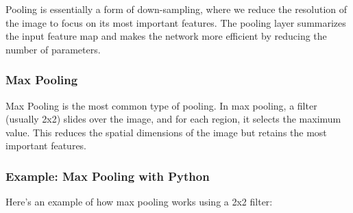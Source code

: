 \documentclass[
  letterpaper,
  DIV=11,
  numbers=noendperiod]{scrreprt}
\begin{document}
Pooling is essentially a form of down-sampling, where we reduce the
resolution of the image to focus on its most important features. The
pooling layer summarizes the input feature map and makes the network
more efficient by reducing the number of parameters.

\subsubsection{Max Pooling}\label{max-pooling}

Max Pooling is the most common type of pooling. In max pooling, a filter
(usually 2x2) slides over the image, and for each region, it selects the
maximum value. This reduces the spatial dimensions of the image but
retains the most important features.

\subsubsection{Example: Max Pooling with
Python}\label{example-max-pooling-with-python}

Here's an example of how max pooling works using a 2x2 filter:
\end{document}
